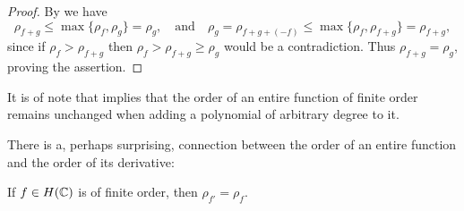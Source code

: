 \begin{proof}
    By  we have 
    \begin{equation*}
        \rho_{f+g} \leq \max \{ \rho_f, \rho_g \} = \rho_g, \quad\textrm{and}\quad \rho_g = \rho_{f+g+(-f)} \leq \max \{ \rho_f, \rho_{f+g} \} = \rho_{f+g},
    \end{equation*}
    since if $\rho_f > \rho_{f+g}$ then $\rho_f > \rho_{f+g} \geq \rho_g$ would be a contradiction. Thus $\rho_{f+g} = \rho_g$, proving the assertion.
\end{proof}

It is of note that  implies that the order of an entire function of finite order remains unchanged when adding a polynomial of arbitrary degree to it.

There is a, perhaps surprising, connection between the order of an entire function and the order of its derivative:

\begin{proposition} \label{prop:order-derivative}
    If $f \in H(\mathbb{C})$ is of finite order, then $\rho_{f'} = \rho_f$.
\end{proposition}

